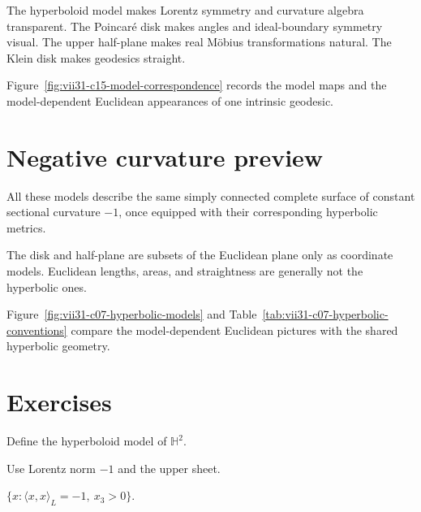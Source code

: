 \begin{proposition}\label{prop:vii31-comparison}
The hyperboloid model makes Lorentz symmetry and curvature algebra transparent.
The Poincaré disk makes angles and ideal-boundary symmetry visual.  The upper
half-plane makes real Möbius transformations natural.  The Klein disk makes
geodesics straight.
\end{proposition}

Figure~\ref{fig:vii31-c15-model-correspondence} records the model maps and the
model-dependent Euclidean appearances of one intrinsic geodesic.


\section{Negative curvature preview}

All these models describe the same simply connected complete surface of constant
sectional curvature \(-1\), once equipped with their corresponding hyperbolic
metrics.

\begin{warning}\label{warn:vii31-euclidean-picture}
The disk and half-plane are subsets of the Euclidean plane only as coordinate
models.  Euclidean lengths, areas, and straightness are generally not the
hyperbolic ones.
\end{warning}


Figure~\ref{fig:vii31-c07-hyperbolic-models} and Table~\ref{tab:vii31-c07-hyperbolic-conventions}
compare the model-dependent Euclidean pictures with the shared hyperbolic geometry.


\section{Exercises}
\begin{exercise}\label{exr:vii31-01}
Define the hyperboloid model of \(\mathbb H^2\).
\end{exercise}
\begin{hint}
Use Lorentz norm \(-1\) and the upper sheet.
\end{hint}
\begin{solution}
\(\{x:\langle x,x\rangle_L=-1,\ x_3>0\}\).
\end{solution}

